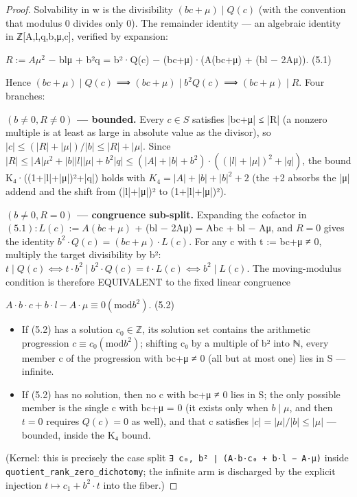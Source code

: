\documentclass[11pt]{article}
\theoremstyle{plain}
\theoremstyle{definition}
\theoremstyle{remark}
\theoremstyle{plain}
\theoremstyle{definition}
\theoremstyle{remark}
\theoremstyle{plain}
\theoremstyle{definition}
\theoremstyle{remark}
\begin{document}
\begin{proof}
Solvability in w is the divisibility $(bc+μ) ∣ Q(c)$ (with the convention that modulus 0 divides only 0). The remainder identity — an algebraic identity in ℤ[A,l,q,b,μ,c], verified by expansion:

$R := Aμ^{2}$ − blμ + b²q      = b²·Q(c) − (bc+μ)·(A(bc+μ) + (bl − 2Aμ)).                (5.1)

Hence $(bc+μ) ∣ Q(c)$ ⟹ $(bc+μ) ∣ b^{2}Q(c)$ ⟹ $(bc+μ) ∣ R$. Four branches:

\textbf{$(b ≠ 0, R ≠ 0)$ — bounded.} Every $c ∈ S$ satisfies |bc+μ| ≤ |R| (a nonzero multiple is at least as large in absolute value as the divisor), so $|c| ≤ (|R|+|μ|)/|b| ≤ |R|+|μ|$. Since $|R| ≤ |A|μ^{2} + |b||l||μ| + b^{2}|q| ≤ (|A|+|b|+b^{2})·((|l|+|μ|)^{2} + |q|)$, the bound K₄·((1+|l|+|μ|)²+|q|) holds with $K_{4} = |A|+|b|+|b|^{2}+2$ (the +2 absorbs the |μ| addend and the shift from (|l|+|μ|)² to (1+|l|+|μ|)²).

\textbf{$(b ≠ 0, R = 0)$ — congruence sub-split.} Expanding the cofactor in $(5.1): L(c) := A(bc+μ)$ + (bl − 2Aμ) = Abc + bl − Aμ, and $R = 0$ gives the identity $b^{2}·Q(c) = (bc+μ)·L(c)$. For any c with t := bc+μ ≠ 0, multiply the target divisibility by b²:  $t ∣ Q(c) ⟺ t·b^{2} ∣ b^{2}·Q(c) = t·L(c) ⟺ b^{2} ∣ L(c)$. The moving-modulus condition is therefore EQUIVALENT to the fixed linear congruence

$A·b·c + b·l − A·μ ≡ 0 (\mathrm{mod} b^{2})$.                              (5.2)

\begin{itemize}
\item If (5.2) has a solution $c_{0} ∈ ℤ$, its solution set contains the arithmetic
progression $c ≡ c_{0} (\mathrm{mod} b^{2})$; shifting c₀ by a multiple of b² into ℕ, every   member c of the progression with bc+μ ≠ 0 (all but at most one) lies in S   — infinite.

\item If (5.2) has no solution, then no c with bc+μ ≠ 0 lies in S; the only
possible member is the single c with bc+μ = 0 (it exists only when   $b ∣ μ$, and then $t = 0$ requires $Q(c) = 0$ as well), and that c satisfies   $|c| = |μ|/|b| ≤ |μ|$ — bounded, inside the K₄ bound.

\end{itemize}
(Kernel: this is precisely the case split \texttt{∃ c₀, b² ∣ (A·b·c₀ + b·l − A·μ)} inside \texttt{quotient\_\allowbreak{}rank\_\allowbreak{}zero\_\allowbreak{}dichotomy}; the infinite arm is discharged by the explicit injection $t ↦ c_{1} + b^{2}·t$ into the fiber.)


\end{proof}
\end{document}
